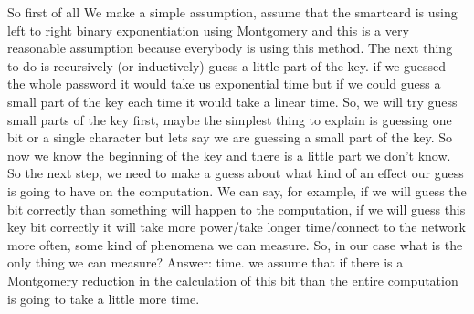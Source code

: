 So first of all We make a simple assumption, assume that the smartcard is using left to right binary exponentiation using Montgomery and this is a very reasonable assumption because everybody is using this method. The next thing to do is recursively (or inductively) guess a little part of the key. if we guessed the whole password it would take us exponential time but if we could guess a small part of the key each time it would take a linear time. So, we will try guess small parts of the key first, maybe the simplest thing to explain is guessing one bit or a single character but lets say we are guessing a small part of the key. So now we know the beginning of the key and there is a little part we don’t know. So the next step, we need to make a guess about what kind of an effect our guess is going to have on the computation. We can say, for example, if we will guess the bit correctly than something will happen to the computation, if we will guess this key bit correctly it will take more power/take longer time/connect to the network more often, some kind of phenomena we can measure. So, in our case what is the only thing we can measure? Answer: time. we assume that if there is a Montgomery reduction in the calculation of this bit than the entire computation is going to take a little more time.


